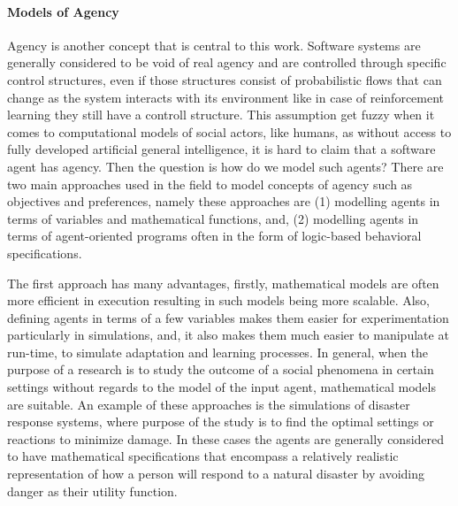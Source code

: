 \paragraph{Models of Agency}
Agency is another concept that is central to this work. Software systems are generally considered to be void of real agency and are controlled through specific control structures, even if those structures consist of probabilistic flows that can change as the system interacts with its environment like in case of reinforcement learning they still have a controll structure. This assumption get fuzzy when it comes to computational models of social actors, like humans, as without access to fully developed artificial general intelligence, it is hard to claim that a software agent has agency. Then the question is how do we model such agents? There are two main approaches used in the field to model concepts of agency such as objectives and preferences, namely these approaches are (1) modelling agents in terms of variables and mathematical functions, and, (2) modelling agents in terms of agent-oriented programs often in the form of logic-based behavioral specifications. 


The first approach has many advantages, firstly, mathematical models are often more efficient in execution resulting in such models being more scalable. Also, defining agents in terms of a few variables makes them easier for experimentation particularly in simulations, and, it also makes them much easier to manipulate at run-time, to simulate adaptation and learning processes. In general, when the purpose of a research is to study the outcome of a social phenomena in certain settings without regards to the model of the input agent, mathematical models are suitable. An example of these approaches is the simulations of disaster response systems, where purpose of the study is to find the optimal settings or reactions to minimize damage. In these cases the agents are generally considered to have mathematical specifications that encompass a relatively realistic representation of how a person will respond to a natural disaster by avoiding danger as their utility function\cite{Something}.


